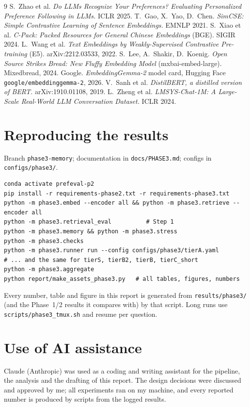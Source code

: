 \documentclass[11pt,a4paper]{article}
\begin{document}
\begin{thebibliography}{9}\small
{} S.~Zhao et al. \emph{Do LLMs Recognize Your Preferences? Evaluating Personalized Preference Following in LLMs.} ICLR 2025.
 T.~Gao, X.~Yao, D.~Chen. \emph{SimCSE: Simple Contrastive Learning of Sentence Embeddings.} EMNLP 2021.
 S.~Xiao et al. \emph{C-Pack: Packed Resources for General Chinese Embeddings} (BGE). SIGIR 2024.
 L.~Wang et al. \emph{Text Embeddings by Weakly-Supervised Contrastive Pre-training} (E5). arXiv:2212.03533, 2022.
 S.~Lee, A.~Shakir, D.~Koenig. \emph{Open Source Strikes Bread: New Fluffy Embedding Model} (mxbai-embed-large). Mixedbread, 2024.
 Google. \emph{EmbeddingGemma-2} model card, Hugging Face \texttt{google/embeddinggemma-2}, 2026.
 V.~Sanh et al. \emph{DistilBERT, a distilled version of BERT.} arXiv:1910.01108, 2019.
 L.~Zheng et al. \emph{LMSYS-Chat-1M: A Large-Scale Real-World LLM Conversation Dataset.} ICLR 2024.
\end{thebibliography}

\appendix
\section{Reproducing the results}
Branch \nolinkurl{phase3-memory}; documentation in \nolinkurl{docs/PHASE3.md}; configs in \nolinkurl{configs/phase3/}.
\begin{verbatim}
conda activate prefeval-p2
pip install -r requirements-phase2.txt -r requirements-phase3.txt
python -m phase3.embed --encoder all && python -m phase3.retrieve --encoder all
python -m phase3.retrieval_eval          # Step 1
python -m phase3.memory && python -m phase3.stress
python -m phase3.checks
python -m phase3.runner run --config configs/phase3/tierA.yaml
# ... and the same for tierS, tierB2, tierB, tierC_short
python -m phase3.aggregate
python report/make_assets_phase3.py   # all tables, figures, numbers
\end{verbatim}
Every number, table and figure in this report is generated from \nolinkurl{results/phase3/} (and the Phase~1/2 results it compares with) by that
script. Long runs use \nolinkurl{scripts/phase3_tmux.sh} and resume per question.

\section{Use of AI assistance}
Claude (Anthropic) was used as a coding and writing assistant for the pipeline, the analysis and the drafting of this report. The design decisions
were discussed and approved by me; all experiments ran on my machine, and every reported number is produced by scripts from the logged results.
\end{document}
